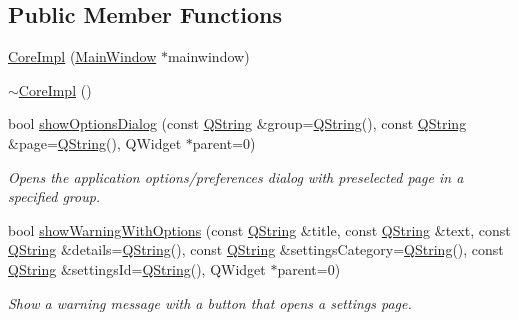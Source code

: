 \subsection*{\-Public \-Member \-Functions}
\begin{DoxyCompactItemize}
\item 
\hyperlink{group___core_plugin_ga61de81df9e02a1a837a850de7d57a95c}{\-Core\-Impl} (\hyperlink{class_core_1_1_internal_1_1_main_window}{\-Main\-Window} $\ast$mainwindow)
\item 
\hyperlink{group___core_plugin_ga192f224c86f0b56e729b841c8f549315}{$\sim$\-Core\-Impl} ()
\item 
bool \hyperlink{group___core_plugin_ga856c862f133ac660cc507aa15973d6a9}{show\-Options\-Dialog} (const \hyperlink{group___u_a_v_objects_plugin_gab9d252f49c333c94a72f97ce3105a32d}{\-Q\-String} \&group=\hyperlink{group___u_a_v_objects_plugin_gab9d252f49c333c94a72f97ce3105a32d}{\-Q\-String}(), const \hyperlink{group___u_a_v_objects_plugin_gab9d252f49c333c94a72f97ce3105a32d}{\-Q\-String} \&page=\hyperlink{group___u_a_v_objects_plugin_gab9d252f49c333c94a72f97ce3105a32d}{\-Q\-String}(), \-Q\-Widget $\ast$parent=0)
\begin{DoxyCompactList}\small\item\em \-Opens the application options/preferences dialog with preselected {\itshape page\/} in a specified {\itshape group\/}. \end{DoxyCompactList}\item 
bool \hyperlink{group___core_plugin_ga283d2fe1d641e7497d3b6b7bd306fd3f}{show\-Warning\-With\-Options} (const \hyperlink{group___u_a_v_objects_plugin_gab9d252f49c333c94a72f97ce3105a32d}{\-Q\-String} \&title, const \hyperlink{group___u_a_v_objects_plugin_gab9d252f49c333c94a72f97ce3105a32d}{\-Q\-String} \&text, const \hyperlink{group___u_a_v_objects_plugin_gab9d252f49c333c94a72f97ce3105a32d}{\-Q\-String} \&details=\hyperlink{group___u_a_v_objects_plugin_gab9d252f49c333c94a72f97ce3105a32d}{\-Q\-String}(), const \hyperlink{group___u_a_v_objects_plugin_gab9d252f49c333c94a72f97ce3105a32d}{\-Q\-String} \&settings\-Category=\hyperlink{group___u_a_v_objects_plugin_gab9d252f49c333c94a72f97ce3105a32d}{\-Q\-String}(), const \hyperlink{group___u_a_v_objects_plugin_gab9d252f49c333c94a72f97ce3105a32d}{\-Q\-String} \&settings\-Id=\hyperlink{group___u_a_v_objects_plugin_gab9d252f49c333c94a72f97ce3105a32d}{\-Q\-String}(), \-Q\-Widget $\ast$parent=0)
\begin{DoxyCompactList}\small\item\em \-Show a warning message with a button that opens a settings page. \end{DoxyCompactList}\item 

\end{DoxyCompactItemize}
